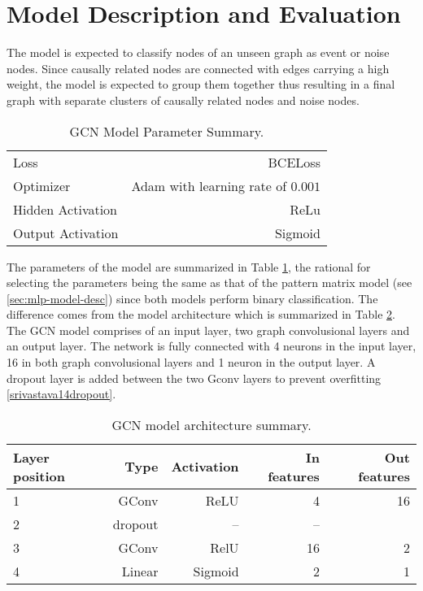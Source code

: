 \section{Model Description and Evaluation}
\label{sec:gcn-model-desc-eval}

The model is expected to classify nodes of an unseen graph as event or
noise nodes. Since causally related nodes are connected with edges
carrying a high weight, the model is expected to group them together
thus resulting in a final graph with separate clusters of causally
related nodes and noise nodes.

\begin{table}[htb]
  \centering
  \begin{tabular}{lr}
    \hline
    Loss & BCELoss \\
    Optimizer & Adam with learning rate of $0.001$ \\
    Hidden Activation & ReLu \\
    Output Activation & Sigmoid \\
    \hline
  \end{tabular}
  \caption{GCN Model Parameter Summary.}
  \label{tab:gcn-model-param}
\end{table}

The parameters of the model are summarized in Table
\ref{tab:gcn-model-param}, the rational for selecting the parameters
being the same as that of the pattern matrix model (see
\ref{sec:mlp-model-desc}) since both models perform binary
classification. The difference comes from the model architecture which
is summarized in Table \ref{tab:gcn-model-arch}. The GCN model
comprises of an input layer, two graph convolusional layers and an
output layer. The network is fully connected with 4 neurons in the
input layer, 16 in both graph convolusional layers and 1 neuron in the
output layer. A dropout layer is added between the two Gconv layers to
prevent overfitting \ref{srivastava14dropout}.

\begin{table}
  \caption{GCN model architecture summary.}
  \begin{tabular}{lrrrr}
    \hline
    Layer position & Type & Activation & In features & Out features \\
    \hline
    1 & GConv & ReLU & 4 & 16 \\
    2 & dropout & -- & -- \\
    3 & GConv & RelU & 16 & 2 \\
    4 & Linear & Sigmoid & 2 & 1 \\
    \hline
  \end{tabular}
  \label{tab:gcn-model-arch}
\end{table}

